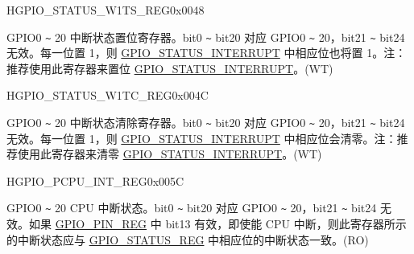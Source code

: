 \begin{register}{H}{GPIO\_STATUS\_W1TS\_REG}{0x0048}\label{regdesc:GPIOSTATUSW1TSREG}
%
%
\regnewline%
\begin{regdesc}\begin{reglist}
\label{fielddesc:GPIOSTATUSW1TS}\item [GPIO\_STATUS\_W1TS] GPIO0 \verb+~+ 20 中断状态置位寄存器。bit0 \verb+~+ bit20 对应 GPIO0 \verb+~+ 20，bit21 \verb+~+ bit24 无效。每一位置 1，则 \hyperref[fielddesc:GPIOSTATUSINTERRUPT]{GPIO\_STATUS\_INTERRUPT} 中相应位也将置 1。注：推荐使用此寄存器来置位 \hyperref[fielddesc:GPIOSTATUSINTERRUPT]{GPIO\_STATUS\_INTERRUPT}。(WT)
\end{reglist}\end{regdesc}
\end{register}


\begin{register}{H}{GPIO\_STATUS\_W1TC\_REG}{0x004C}\label{regdesc:GPIOSTATUSW1TCREG}
%
%
\regnewline%
\begin{regdesc}\begin{reglist}
\label{fielddesc:GPIOSTATUSW1TC}\item [GPIO\_STATUS\_W1TC] GPIO0 \verb+~+ 20 中断状态清除寄存器。bit0 \verb+~+ bit20 对应 GPIO0 \verb+~+ 20，bit21 \verb+~+ bit24 无效。每一位置 1，则 \hyperref[fielddesc:GPIOSTATUSINTERRUPT]{GPIO\_STATUS\_INTERRUPT} 中相应位会清零。注：推荐使用此寄存器来清零 \hyperref[fielddesc:GPIOSTATUSINTERRUPT]{GPIO\_STATUS\_INTERRUPT}。(WT)
\end{reglist}\end{regdesc}
\end{register}


\begin{register}{H}{GPIO\_PCPU\_INT\_REG}{0x005C}\label{regdesc:GPIOPCPUINTREG}
%
%
\regnewline%
\begin{regdesc}\begin{reglist}
\label{fielddesc:GPIOPROCPUINT}\item [GPIO\_PROCPU\_INT]

GPIO0 \verb+~+ 20 CPU 中断状态。bit0 \verb+~+ bit20 对应 GPIO0 \verb+~+ 20，bit21 \verb+~+ bit24 无效。如果 \hyperref[regdesc:GPIOPINNREG]{GPIO\_PIN\_REG} 中 bit13 有效，即使能 CPU 中断，则此寄存器所示的中断状态应与 \hyperref[regdesc:GPIOSTATUSREG]{GPIO\_STATUS\_REG} 中相应位的中断状态一致。(RO)
\end{reglist}\end{regdesc}
\end{register}




